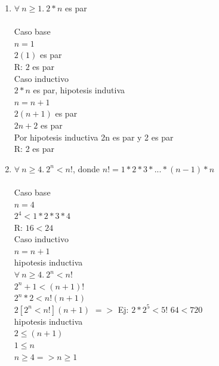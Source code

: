 \documentclass{article}
\begin{document}
\begin{enumerate}
        \item{$\forall\ n\geq 1.\ 2 \ast n$ es par}\\
        \\
        Caso base\\
        {$n=1 $}\\
        {$2(1)$} es par\\
       R: {$2 $} es par\\
      
        Caso inductivo\\
        {$2\ast n$} es par, hipotesis indutiva\\
        {$ n= n+1$}\\
        {$2(n+1)$} es par\\
        {$2n + 2$} es par\\
        Por hipotesis inductiva 2n es par y 2 es par\\
        R: 2 es par\\
        
        \item{$\forall\ n\geq 4.\ 2^n < n!$, donde $n!= 1\ast 2\ast 3\ast...\ast(n-1)\ast n  $}\\
        \\
        Caso base\\
        {$n=4$}\\
        {$2^4 < 1\ast 2\ast 3\ast 4$}\\
        R: {$16 < 24$}\\
        
    
        Caso inductivo\\
        {$n = n+1$}\\
        hipotesis inductiva\\
        {$\forall\ n\geq 4.\ 2^n < n!$}\\
        {$2^n+1 < (n+1)!$}\\
        {$2^n\ast 2 < n! (n+1)$}\\
        {$2[2^n < n!](n+1)$} {$=>$} Ej: {$2\ast 2^5 < 5! $}
        {$64 < 720 $}\\
        hipotesis inductiva\\
        {$2\leq (n+1)$}\\
        {$1\leq n$}\\
        {$n\geq 4  => n\geq 1$}\\
        
      
\end{enumerate}
\end{document}
